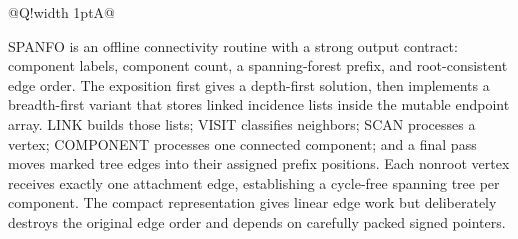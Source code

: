 \documentclass[10pt,letterpaper]{article}
\begin{document}
\begin{longtable}{@{}Q!{\color{Mist}\vrule width 1pt}A@{}}
\end{longtable}
\begin{tcolorbox}[colback=Ink!4,colframe=Ink,title=Cornell summary]
SPANFO is an offline connectivity routine with a strong output contract: component labels, component count, a spanning-forest prefix, and root-consistent edge order. The exposition first gives a depth-first solution, then implements a breadth-first variant that stores linked incidence lists inside the mutable endpoint array. LINK builds those lists; VISIT classifies neighbors; SCAN processes a vertex; COMPONENT processes one connected component; and a final pass moves marked tree edges into their assigned prefix positions. Each nonroot vertex receives exactly one attachment edge, establishing a cycle-free spanning tree per component. The compact representation gives linear edge work but deliberately destroys the original edge order and depends on carefully packed signed pointers.
\end{tcolorbox}
\end{document}
